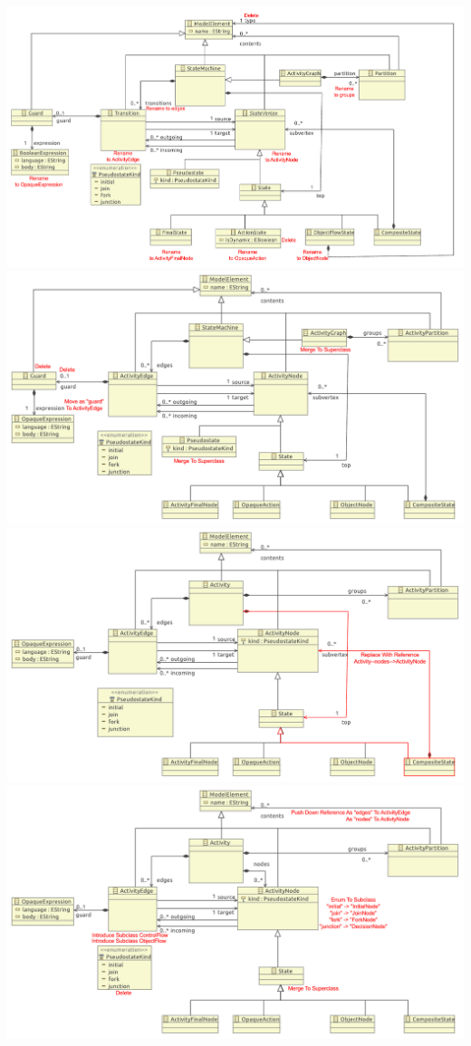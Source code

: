 \documentclass[a4paper,10pt]{article}
\title{}
\author{}
\begin{document}
\includegraphics[width=\textwidth]{0/original_minimal_metamodel_0}
\vspace{1em}
\includegraphics[width=\textwidth]{1/original_minimal_metamodel_1}
\vspace{1em}
\includegraphics[width=\textwidth]{2/original_minimal_metamodel_2}
\vspace{1em}
\includegraphics[width=\textwidth]{3/original_minimal_metamodel_3}
\end{document}
